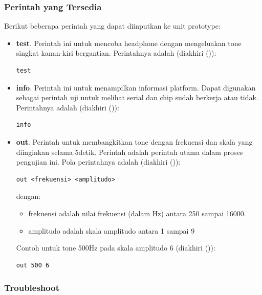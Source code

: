 \documentclass[12pt,]{article}
\begin{document}
	\subsubsection{Perintah yang Tersedia}
	
	Berikut beberapa perintah yang dapat diinputkan ke unit prototype:
	
	\begin{itemize}
		\item \textbf{test}.
		Perintah ini untuk mencoba headphone dengan mengeluakan tone singkat kanan-kiri bergantian.
		Perintahnya adalah (diakhiri (\keys{\return})):
		\begin{verbatim}
test
		\end{verbatim}
		
		\item \textbf{info}.
		Perintah ini untuk menampilkan informasi platform.
		Dapat digunakan sebagai perintah uji untuk melihat serial dan chip sudah berkerja atau tidak.
		Perintahnya adalah (diakhiri (\keys{\return})):
		\begin{verbatim}
info
		\end{verbatim}
		
		\item \textbf{out}.
		Perintah untuk membangkitkan tone dengan frekuensi dan skala yang diinginkan selama 5detik.
		Perintah adalah perintah utama dalam proses pengujian ini.
		Pola perintahnya adalah (diakhiri (\keys{\return})):
		\begin{verbatim}
out <frekuensi> <amplitudo>
		\end{verbatim}
		dengan:
		\begin{itemize}
			\item frekuensi adalah nilai frekuensi (dalam Hz) antara 250 sampai 16000.
			\item amplitudo adalah skala amplitudo antara 1 sampai 9
		\end{itemize}
		Contoh untuk tone 500Hz pada skala amplitudo 6 (diakhiri (\keys{\return})):
		\begin{verbatim}
out 500 6
		\end{verbatim}
	\end{itemize}

	\newpage
	\subsubsection{Troubleshoot}
	
\end{document}

